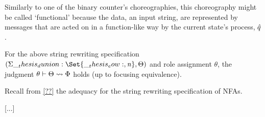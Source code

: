 Similarly to one of the binary counter's choreographies, this choreography might be called \enquote*{functional} because the data, an input string, are represented by messages that are acted on in a function-like way by the current state's process, $\hat{q}$.

\begin{proposition}\label{prop:formula-as-process:nfa-functional-chorsig}
  For the above string rewriting specification $(\sralph \dunion \Set{\eow, \symrej}, \srsig)$ and role assignment $\theta$, the judgment $\theta \vdash \Theta \rightsquigarrow \Phi$ holds (up to focusing equivalence).
\end{proposition}


Recall from \cref{??} the adequacy  for the string rewriting specification of \acp{NFA}.

[...]

